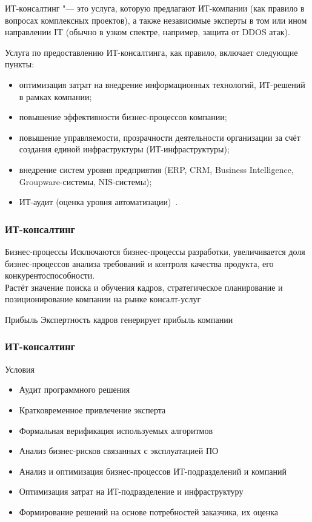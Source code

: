 \documentclass{../industrial-development}
\begin{document}
ИТ-консалтинг "--- это услуга, которую предлагают ИТ-компании (как правило в вопросах комплексных проектов), а также независимые эксперты в том или ином направлении IT (обычно в узком спектре, например, защита от DDOS атак).

Услуга по предоставлению ИТ-консалтинга, как правило, включает следующие пункты:
\begin{itemize}
	\item оптимизация затрат на внедрение информационных технологий, ИТ-решений в рамках компании;
	\item повышение эффективности бизнес-процессов компании;
	\item повышение управляемости, прозрачности деятельности организации за счёт создания единой инфраструктуры (ИТ-инфраструктуры);
	\item внедрение систем уровня предприятия (ERP, CRM, Business Intelligence, Groupware-системы, NIS-системы);
	\item ИТ-аудит (оценка уровня автоматизации)~\cite{Wiki2}.
\end{itemize}


\begin{frame} \frametitle{ИТ-консалтинг}
	\begin{block}{Бизнес-процессы}
		Исключаются бизнес-процессы разработки, увеличивается доля бизнес-процессов анализа требований и контроля качества продукта, его конкурентоспособности.\\
		Растёт значение поиска и обучения кадров, стратегическое планирование и позиционирование компании на рынке консалт-услуг
	\end{block}
	\begin{block}{Прибыль}
		Экспертность кадров генерирует прибыль компании
	\end{block}
\end{frame}


\begin{frame} \frametitle{ИТ-консалтинг}
	\begin{block}{Условия}
		\begin{itemize}
			\item Аудит программного решения
			\item Кратковременное привлечение эксперта
			\item Формальная верификация используемых алгоритмов
			\item Анализ бизнес-рисков связанных с эксплуатацией ПО
			\item Анализ и оптимизация бизнес-процессов ИТ-подразделений и компаний
			\item Оптимизация затрат на ИТ-подразделение и инфраструктуру
			\item Формирование решений на основе потребностей заказчика, их оценка
		\end{itemize}
	\end{block}
\end{frame}
\end{document}
